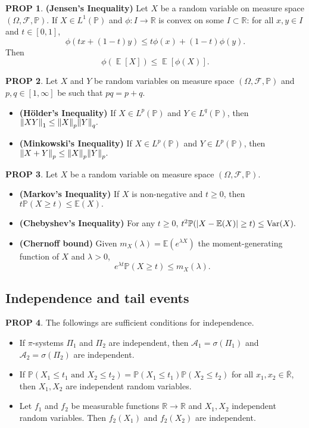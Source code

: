 \documentclass[hidelinks,11pt]{article}
\theoremstyle{definition}
\theoremstyle{dotless}
\newtheorem{prop}{PROP}[section]
\theoremstyle{remark}
\DeclareMathOperator{\Var}{Var}
\DeclareMathOperator{\E}{\mathbb{E}}
\DeclareMathOperator{\1}{\mathbf{1}}
\begin{document}
\begin{prop}\textup{\textbf{(Jensen's Inequality) }}Let $X$ be a random variable on measure space $(\Omega,\mathcal{F},\mathbb{P})$. If $X\in L^1(\mathbb{P})$ and $\phi:I\to\mathbb{R}$ is convex on some $I\subset\mathbb{R}$: for all $x,y\in I$ and $t\in[0,1]$,
\[\phi(tx+(1-t)y)\leq t\phi(x)+(1-t)\phi(y).\]
Then
\[\phi(\E[X])\leq\E[\phi(X)].\]
\end{prop}

\begin{prop}
Let $X$ and $Y$ be random variables on measure space $(\Omega,\mathcal{F},\mathbb{P})$ and $p,q\in[1,\infty]$ be such that $pq=p+q$.
\begin{itemize}
    \item \textup{\textbf{(Hölder's Inequality)}} If $X\in L^p(\mathbb{P})$ and $Y\in L^q(\mathbb{P})$, then $\norm{XY}_1\leq\norm{X}_p\norm{Y}_q.$
    \item \textup{\textbf{(Minkowski's Inequality)}} If $X\in L^p(\mathbb{P})$ and $Y\in L^p(\mathbb{P})$, then $\norm{X+Y}_{p}\leq\norm{X}_p\norm{Y}_p.$
\end{itemize}
\end{prop}

\begin{prop}
Let $X$ be a random variable on measure space $(\Omega,\mathcal{F},\mathbb{P})$.
\begin{itemize}
    \item \textup{\textbf{(Markov's Inequality)}} If $X$ is non-negative and $t\geq0$, then $t\mathbb{P}(X\geq t)\leq\mathbb{E}(X).$
    \item \textup{\textbf{(Chebyshev's Inequality)}} For any $t\geq0$, $t^2\mathbb{P}(\abs{X-\mathbb{E}(X)}\geq t)\leq\Var(X).$
    \item \textup{\textbf{(Chernoff bound)}} Given $m_X(\lambda)=\mathbb{E}(e^{\lambda X})$ the moment-generating function of $X$ and $\lambda>0$,
    \[e^{\lambda t}\mathbb{P}(X\geq t)\leq m_X(\lambda).\]
\end{itemize}
\end{prop}

\subsection{Independence and tail events}

\begin{prop}The followings are sufficient conditions for independence.\begin{itemize}
    \item If $\pi$-systems $\Pi_1$ and $\Pi_2$ are  independent, then $\mathcal{A}_1=\sigma(\Pi_1)$ and $\mathcal{A}_2=\sigma(\Pi_2)$ are independent.
    \item If $\mathbb{P}(X_1\leq t_1\textrm{ and }X_2\leq t_2)=\mathbb{P}(X_1\leq t_1)\mathbb{P}(X_2\leq t_2)$ for all $x_1,x_2\in\overline{\mathbb{R}}$, then $X_1,X_2$ are independent random variables.
    \item Let $f_1$ and $f_2$ be measurable functions $\mathbb{R}\to\mathbb{R}$ and $X_1,X_2$ independent random variables. Then $f_2(X_1)$ and $f_2(X_2)$ are independent.
\end{itemize}
\end{prop}
\end{document}
